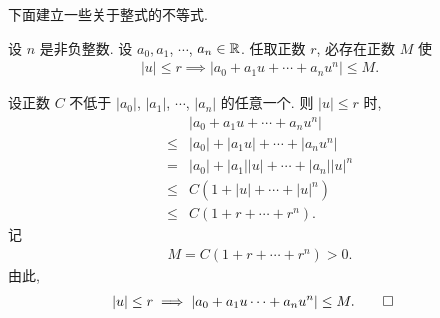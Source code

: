 









下面建立一些关于整式的不等式.

\begin{proposition}
    设 $n$ 是非负整数. 设 $a_0, a_1$, $\cdots$, $a_n \in \mathbb{R}$. 任取正数 $r$, 必存在正数 $M$ 使
    \begin{align*}
        |u| \leq r \implies |a_0 + a_1 u + \cdots + a_n u^n| \leq M.
    \end{align*}
\end{proposition}

\begin{pf}
    设正数 $C$ 不低于 $|a_0|$, $|a_1|$, $\cdots$, $|a_n|$ 的任意一个. 则 $|u| \leq r$ 时,
    \begin{align*}
                & |a_0 + a_1 u + \cdots + a_n u^n|         \\
        \leq {} & |a_0| + |a_1 u| + \cdots + |a_n u^n|     \\
        = {}    & |a_0| + |a_1| |u| + \cdots + |a_n| |u|^n \\
        \leq {} & C (1 + |u| + \cdots + |u|^n)             \\
        \leq {} & C (1 + r + \cdots + r^n).
    \end{align*}
    记
    \begin{align*}
        M = C (1 + r + \cdots + r^n) > 0.
    \end{align*}
    由此,
    \begin{align*}
         & |u| \leq r \implies |a_0 + a_1 u \cdots + a_n u^n| \leq M. \qedhere
    \end{align*}
\end{pf}


